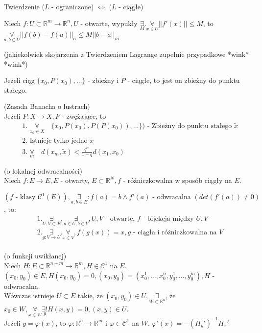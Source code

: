 \documentclass{article}
\begin{document}
\begin{tw}
Twierdzenie ($L$ - ograniczone) $\iff$ ($L$ - ciągłe)
\end{tw}
\begin{stw}
Niech $f: U\subset \mathbb{R}^m \to \mathbb{R}^n, U$ - otwarte, wypukły
$\underset{M}{\exists}.\underset{x\in U}{\forall}||f'(x)||\leq M$, to $\underset{a,b\in U}{\forall}||f(b)-f(a)||_n \leq M||b-a||_m$ \begin{tiny}(jakiekolwiek skojarzenia z Twierdzeniem Lagrange zupełnie przypadkowe *wink* *wink*)\end{tiny}
\end{stw}
\begin{tw}
Jeżeli ciąg $\{x_0, P(x_0), \dots \} $ - zbieżny i $P$ - ciągłe, to jest on zbieżny do punktu stałego.
\end{tw}
\begin{tw}
(Zasada Banacha o lustrach)\\
Jeżeli $P: X \to X, P$ - zwężające, to
\begin{align}\label{eq:banach}
&\text{1. } \underset{x_0 \in X}{\forall}\quad \{x_0,P(x_0),P(P(x_0)),\dots\}) \text{ - Zbieżny do punktu stałego } \tilde x\\
&\text{2. Istnieje tylko jedno }\tilde x\\
&\text{3. } \underset{m}{\forall}\quad d(x_m,\tilde x) < \frac{q^m}{1-q} d(x_1, x_0)
\end{align}
\end{tw}
\begin{tw}
(o lokalnej odwracalności)\\

Niech $f: E \to E, E$ - otwarty, $E\subset \mathbb{R}^N, f$ - różniczkowalna w sposób ciągły na $E$.

$(f \text{ - klasy } \mathcal{C}^1 (E)), \underset{a,b\in E}{\exists}:f(a) = b \land f'(a) \text{ - odwracalna } (det(f'(a))\neq 0)$, to:
\begin{align*}
&1. \underset{U,V\subset E}{\exists}, \underset{a\in U, b\in V}{\exists}, U,V \text{ - otwarte, }f \text{ - bijekcja między } U,V\\
&2. \underset{g: V\to U}{\exists}.\underset{x\in V}{\forall}, f(g(x)) = x, g\text{ - ciągła i różniczkowalna na } V\\
\end{align*}
\end{tw}
\begin{tw}
(o funkcji uwikłanej)\\
Niech $H:E\subset\mathbb{R}^{n+m}\to\mathbb{R}^{m},H\in\mathcal{C}^{1}$ na $E$. $(x_0,y_0)\in E, H(x_0,y_0)=0, (x_0,y_0) = (x_0^1,\ldots,x_0^n,y_0^1,\ldots,y_0^m), H$ - odwracalna.\\
Wówczas istnieje  $U\subset E$ takie, że $(x_0,y_0)\in U, \underset{W\subset \mathbb{R}^{n}}{\exists} $, że $x_0\in W, \underset{x\in W}{\forall} \underset{y}{\exists !} H(x,y) = 0, (x,y) \in U$.\\
Jeżeli $y= \varphi(x)$, to $\varphi:\mathbb{R}^{n}\to\mathbb{R}^{m}$ i $\varphi\in \mathcal{C}^{1}$ na $W$. $\varphi'(x) = -(H_y')^{-1}H_x'$
\end{tw}
\end{document}
